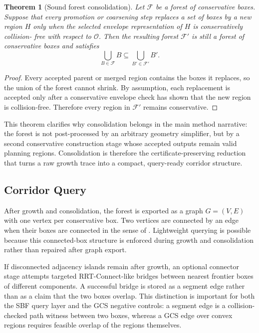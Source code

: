 \documentclass[journal]{IEEEtran}
\newtheorem{theorem}{Theorem}
\newcommand{\calO}{\ensuremath{\mathcal{O}}}
\begin{document}
\begin{theorem}[Sound forest consolidation]
\label{thm:forest_consolidation}
Let $\mathcal{F}$ be a forest of conservative boxes. Suppose that every promotion
or coarsening step replaces a set of boxes by a new region $H$ only when the
selected envelope representation of $H$ is conservatively collision-
free with respect to $\calO$. Then the resulting forest
$\mathcal{F}'$ is still a forest of conservative boxes and satisfies
\[
\bigcup_{B\in\mathcal{F}} B \subseteq \bigcup_{B'\in\mathcal{F}'} B'.
\]
\end{theorem}

\begin{proof}
Every accepted parent or merged region contains the boxes it replaces, so the
union of the forest cannot shrink. By assumption, each replacement is accepted
only after a conservative envelope check has shown that the new region is
collision-free. Therefore every region in $\mathcal{F}'$ remains conservative.
\end{proof}

This theorem clarifies why consolidation belongs in the main method narrative:
the forest is not post-processed by an arbitrary geometry simplifier, but by a
second conservative construction stage whose accepted outputs remain valid
planning regions. Consolidation is therefore the certificate-preserving
reduction that turns a raw growth trace into a compact, query-ready corridor
structure.

\subsection{Corridor Query}
\label{sec:forest_graph}

After growth and consolidation, the forest is exported as a graph
$G=(V,E)$ with one vertex per conservative box. Two vertices are connected by an
edge when their boxes are connected in the sense of
. Lightweight querying is possible because this
connected-box structure is enforced during growth and consolidation rather
than repaired after graph export.

If disconnected adjacency islands remain after growth, an optional connector
stage attempts targeted RRT-Connect-like bridges between nearest frontier boxes
of different components. A successful bridge is stored as a segment edge rather
than as a claim that the two boxes overlap. This distinction is important for
both the SBF query layer and the GCS negative controls: a segment edge is a
collision-checked path witness between two boxes, whereas a GCS edge over
convex regions requires feasible overlap of the regions themselves.
\end{document}
